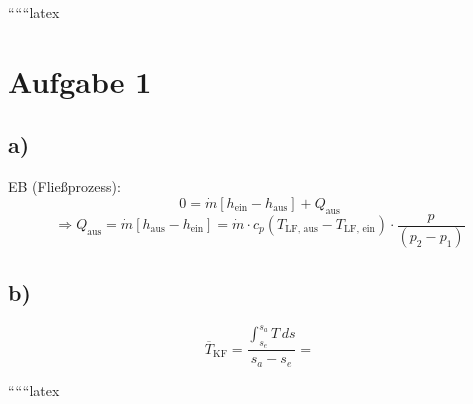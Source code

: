 
``````latex


\section*{Aufgabe 1}

\subsection*{a)}
EB (Fließprozess):
\[
0 = \dot{m} \left[ h_{\text{ein}} - h_{\text{aus}} \right] + Q_{\text{aus}}
\]
\[
\Rightarrow Q_{\text{aus}} = \dot{m} \left[ h_{\text{aus}} - h_{\text{ein}} \right] = \dot{m} \cdot c_p \left( T_{\text{LF, aus}} - T_{\text{LF, ein}} \right) \cdot \frac{p}{\left( p_2 - p_1 \right)}
\]

\subsection*{b)}
\[
\overline{T}_{\text{KF}} = \frac{\int_{s_e}^{s_a} T \, ds}{s_a - s_e} =
\]

``````latex



